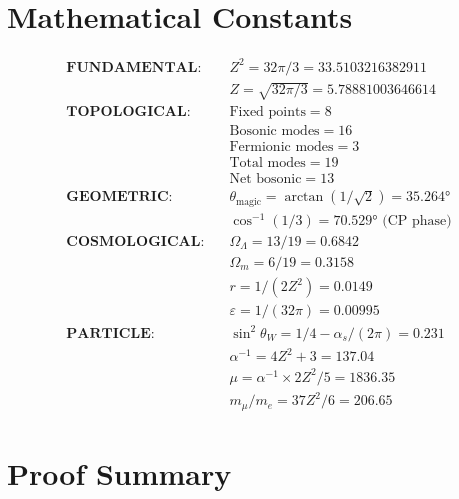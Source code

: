 \documentclass[12pt,a4paper]{article}
\newcommand{\OmegaL}{\Omega_\Lambda}
\newcommand{\OmegaM}{\Omega_m}
\newcommand{\sinW}{\sin^2\theta_W}
\newcommand{\Zsq}{Z^2}
\begin{document}
\section{Mathematical Constants}

\begin{align}
\textbf{FUNDAMENTAL:} \quad & \Zsq = 32\pi/3 = 33.5103216382911 \\
& Z = \sqrt{32\pi/3} = 5.78881003646614 \\[1em]
\textbf{TOPOLOGICAL:} \quad & \text{Fixed points} = 8 \\
& \text{Bosonic modes} = 16 \\
& \text{Fermionic modes} = 3 \\
& \text{Total modes} = 19 \\
& \text{Net bosonic} = 13 \\[1em]
\textbf{GEOMETRIC:} \quad & \theta_{\text{magic}} = \arctan(1/\sqrt{2}) = 35.264° \\
& \cos^{-1}(1/3) = 70.529° \text{ (CP phase)} \\[1em]
\textbf{COSMOLOGICAL:} \quad & \OmegaL = 13/19 = 0.6842 \\
& \OmegaM = 6/19 = 0.3158 \\
& r = 1/(2\Zsq) = 0.0149 \\
& \varepsilon = 1/(32\pi) = 0.00995 \\[1em]
\textbf{PARTICLE:} \quad & \sinW = 1/4 - \alpha_s/(2\pi) = 0.231 \\
& \alpha^{-1} = 4\Zsq + 3 = 137.04 \\
& \mu = \alpha^{-1} \times 2\Zsq/5 = 1836.35 \\
& m_\mu/m_e = 37\Zsq/6 = 206.65
\end{align}

\section{Proof Summary}
\end{document}
